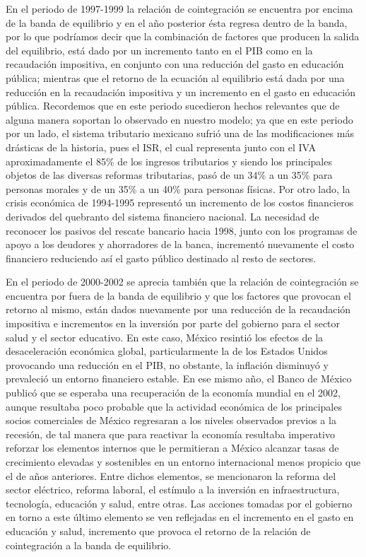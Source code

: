 En el periodo de 1997-1999 la relación de cointegración se encuentra por encima de la banda de equilibrio y en el año posterior ésta regresa dentro de la banda, por lo que podríamos decir que la combinación de factores que producen la salida del equilibrio, está dado por un incremento tanto en el PIB como en la recaudación impositiva, en conjunto con una reducción del gasto en educación pública; mientras que el retorno de la ecuación al equilibrio está dada por una reducción en la recaudación impositiva y un incremento en el gasto en educación pública. Recordemos que en este periodo sucedieron hechos relevantes que de alguna manera soportan lo observado en nuestro modelo; ya que en este periodo por un lado, el sistema tributario mexicano sufrió una de las modificaciones más drásticas de la historia, pues el ISR, el cual representa junto con el IVA aproximadamente el 85\% de los ingresos tributarios y siendo los principales objetos de las diversas reformas tributarias, pasó de un 34\% a un 35\% para personas morales y de un 35\% a un 40\% para personas físicas. Por otro lado, la crisis económica de 1994-1995 representó un incremento de los costos financieros derivados del quebranto del sistema financiero nacional. La necesidad de reconocer los pasivos del rescate bancario hacia 1998, junto con los programas de apoyo a los deudores y ahorradores de la banca, incrementó nuevamente el costo financiero reduciendo así el gasto público destinado al resto de sectores.\bigskip


En el periodo de 2000-2002 se aprecia también que la relación de cointegración se encuentra por fuera de la banda de equilibrio y que los factores que provocan el retorno al mismo, están dados nuevamente por una reducción de la recaudación impositiva e incrementos en la inversión por parte del gobierno para el sector salud y el sector educativo. En este caso, México resintió los efectos de la desaceleración económica global, particularmente la de los Estados Unidos provocando una reducción en el PIB, no obstante, la inflación disminuyó y prevaleció un entorno financiero estable. En ese mismo año, el Banco de México publicó que se esperaba una recuperación de la economía mundial en el 2002, aunque resultaba poco probable que la actividad económica de los principales socios comerciales de México regresaran a los niveles observados previos a la recesión, de tal manera que para reactivar la economía resultaba imperativo reforzar los elementos internos que le permitieran a México alcanzar tasas de crecimiento elevadas y sostenibles en un entorno internacional menos propicio que el de años anteriores. Entre dichos elementos, se mencionaron la reforma del sector eléctrico, reforma laboral, el estímulo a la inversión en infraestructura, tecnología, educación y salud, entre otras. Las acciones tomadas por el gobierno en torno a este último elemento se ven reflejadas en el incremento en el gasto en educación y salud, incremento que provoca el retorno de la relación de cointegración a la banda de equilibrio.\bigskip



